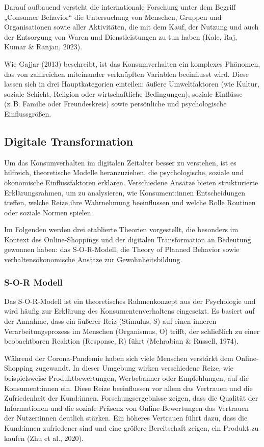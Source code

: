 Darauf aufbauend versteht die internationale Forschung unter dem Begriff „Consumer Behavior“ die Untersuchung von Menschen, Gruppen und Organisationen sowie aller Aktivitäten, die mit dem Kauf, der Nutzung und auch der Entsorgung von Waren und Dienstleistungen zu tun haben (Kale, Raj, Kumar \& Ranjan, 2023).  

Wie Gajjar (2013) beschreibt, ist das Konsumverhalten ein komplexes Phänomen, das von zahlreichen miteinander verknüpften Variablen beeinflusst wird. Diese lassen sich in drei Hauptkategorien einteilen: äußere Umweltfaktoren (wie Kultur, soziale Schicht, Religion oder wirtschaftliche Bedingungen), soziale Einflüsse (z. B. Familie oder Freundeskreis) sowie persönliche und psychologische Einflussgrößen. 

\subsection{Digitale Transformation}
Um das Konsumverhalten im digitalen Zeitalter besser zu verstehen, ist es hilfreich, theoretische Modelle heranzuziehen, die psychologische, soziale und ökonomische Einflussfaktoren erklären. Verschiedene Ansätze bieten strukturierte Erklärungsrahmen, um zu analysieren, wie Konsument:innen Entscheidungen treffen, welche Reize ihre Wahrnehmung beeinflussen und welche Rolle Routinen oder soziale Normen spielen. 

Im Folgenden werden drei etablierte Theorien vorgestellt, die besonders im Kontext des Online-Shoppings und der digitalen Transformation an Bedeutung gewonnen haben: 
das S-O-R-Modell, die Theory of Planned Behavior sowie verhaltensökonomische Ansätze zur Gewohnheitsbildung. 
\subsubsection{S-O-R Modell}
Das S-O-R-Modell ist ein theoretisches Rahmenkonzept aus der Psychologie und wird häufig zur Erklärung des Konsumentenverhaltens eingesetzt. Es basiert auf der Annahme, dass ein äußerer Reiz (Stimulus, S) auf einen inneren Verarbeitungsprozess im Menschen (Organismus, O) trifft, der schließlich zu einer beobachtbaren Reaktion (Response, R) führt (Mehrabian \& Russell, 1974). 

Während der Corona-Pandemie haben sich viele Menschen verstärkt dem Online-Shopping zugewandt. In dieser Umgebung wirken verschiedene Reize, wie beispielsweise Produktbewertungen, Werbebanner oder Empfehlungen, auf die Konsument:innen ein. Diese Reize beeinflussen vor allem das Vertrauen und die Zufriedenheit der Kund:innen. Forschungsergebnisse zeigen, dass die Qualität der Informationen und die soziale Präsenz von Online-Bewertungen das Vertrauen der Nutzer:innen deutlich stärken. Ein höheres Vertrauen führt dazu, dass die Kund:innen zufriedener sind und eine größere Bereitschaft zeigen, ein Produkt zu kaufen (Zhu et al., 2020). 

